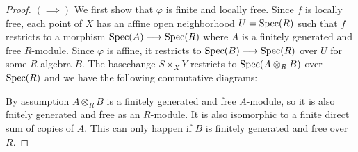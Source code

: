\begin{proof}
	$(\implies)$
	We first show that $\varphi$ is finite and locally free. Since $f$ is locally free, each point of $X$ has an affine open neighborhood $U = \operatorname{Spec}(R)$ such that $f$ restricts to a morphism $\operatorname{Spec}(A) \longrightarrow \operatorname{Spec}(R)$ where $A$ is a finitely generated and free $R$-module. Since $\varphi$ is affine, it restricts to $\operatorname{Spec}(B) \longrightarrow \operatorname{Spec}(R)$ over $U$ for some $R$-algebra $B$. The basechange $S \times_X Y$ restricts to $\operatorname{Spec}(A \otimes_R B)$ over $\operatorname{Spec}(R)$ and we have the following commutative diagrams:
	\begin{figure}
		\centering
		\begin{minipage}{0.4\textwidth}
		\end{minipage}
		\begin{minipage}{0.4\textwidth}
		\end{minipage}
	\end{figure}

	By assumption $A \otimes_R B$ is a finitely generated and free $A$-module, so it is also fnitely generated and free as an $R$-module. It is also isomorphic to a finite direct sum of copies of $A$. This can only happen if $B$ is finitely generated and free over $R$. \par


\end{proof}
